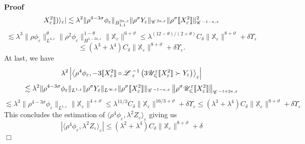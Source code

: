 \documentclass[a4paper,11pt]{article}
\newenvironment{proof}{\noindent\textbf{Proof\ }}{\hspace*{\fill}$\Box$\medskip}
\numberwithin{equation}{section}
\newcommand{\LL}{\mathscr{L} \hspace{.2em}}
\newcommand{\UU}{\mathscr{U}}
\begin{document}
\begin{proof}
\[     X_{\varepsilon}^2 \rrbracket) \rangle_{\varepsilon} | \lesssim \lambda^2
     \| \rho^{4 - 3 \sigma} \phi_{\varepsilon} \|_{B^{2 \kappa,
     \varepsilon}_{1, 1}} \| \rho^{\sigma} Y_{\varepsilon} \|_{\mathscr{C}
     \hspace{.1em}^{2 \kappa, \varepsilon}} \| \rho^{\sigma} \llbracket
     X_{\varepsilon}^2 \rrbracket \|^2_{\mathscr{C} \hspace{.1em}^{- 1 -
     \kappa, \varepsilon}} \]
  \[ \lesssim \lambda^3 \| \rho \phi_{\varepsilon} \|_{L^{4,
     \varepsilon}}^{\theta} \| \rho^2 \phi_{\varepsilon} \|_{H^{1 - 2 \kappa,
     \varepsilon}}^{1 - \theta} \| \mathbb{X}_{\varepsilon} \|^{6 + \vartheta}
     \leqslant \lambda^{(12 - \theta) / (2 + \theta)} C_{\delta} \|
     \mathbb{X}_{\varepsilon} \|^{8 + \vartheta} + \delta
     \Upsilon_{\varepsilon} \]
  \[ \leqslant (\lambda^3 + \lambda^4) C_{\delta}^{} \|
     \mathbb{X}_{\varepsilon} \|^{8 + \vartheta} + \delta
     \Upsilon_{\varepsilon} . \]
  At last, we have
  \[ \lambda^2 \left| \left\langle \rho^4 \phi_{\varepsilon}, - 3 \llbracket
     X_{\varepsilon}^2 \rrbracket \circ \LL_{\varepsilon}^{- 1} \left( 3
     \UU^{\varepsilon}_{\leqslant} \llbracket X_{\varepsilon}^2 \rrbracket
     \succ Y_{\varepsilon} \right) \right\rangle_{\varepsilon} \right| \]
  \[ \lesssim \lambda^2 \| \rho^{4 - 3 \sigma} \phi_{\varepsilon} \|_{L^{1,
     \varepsilon}} \| \rho^{\sigma} Y_{\varepsilon} \|_{L^{\infty,
     \varepsilon}} \| \rho^{\sigma} \llbracket X_{\varepsilon}^2 \rrbracket
     \|_{\mathscr{C} \hspace{.1em}^{- 1 - \kappa, \varepsilon}} \left\|
     \rho^{\sigma} \UU^{\varepsilon}_{\leqslant} \llbracket X_{\varepsilon}^2
     \rrbracket \right\|_{\mathscr{C} \hspace{.1em}^{- 1 + 2 \kappa,
     \varepsilon}} \]
  \[ \lesssim \lambda^3 \| \rho^{4 - 3 \sigma} \phi_{\varepsilon} \|_{L^{1,
     \varepsilon}} \| \mathbb{X}_{\varepsilon} \|^{4 + \vartheta} \leqslant
     \lambda^{11 / 3} C_{\delta} \| \mathbb{X}_{\varepsilon} \|^{16 / 3 +
     \vartheta} + \delta \Upsilon_{\varepsilon} \leqslant (\lambda^3 +
     \lambda^4) C_{\delta}^{} \| \mathbb{X}_{\varepsilon} \|^{8 + \vartheta} +
     \delta \Upsilon_{\varepsilon} \]
  This concludes the estimation of $\langle \rho^4 \phi_{\varepsilon},
  \lambda^2 Z_{\varepsilon} \rangle_{\varepsilon}$ giving us
  \[ | \langle \rho^4 \phi_{\varepsilon}, \lambda^2 Z_{\varepsilon}
     \rangle_{\varepsilon} | \leqslant (\lambda^2 + \lambda^4) C_{\delta}^{}
     \| \mathbb{X}_{\varepsilon} \|^{8 + \vartheta} + \delta
\]
\end{proof}
\end{document}
